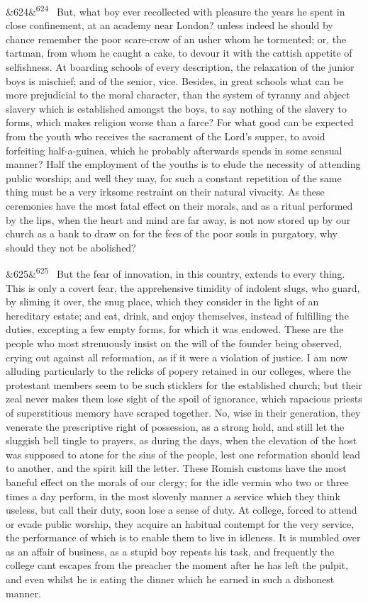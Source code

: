 \documentclass[12pt]{article}
\newcommand{\para}[1][]{\par\noindent\ifx&#1&\else\textsuperscript{\footnotesize #1}~\fi}
\begin{document}
\para[624] But, what boy ever recollected with pleasure the years he spent in close confinement, at an academy near London? unless indeed he should by chance remember the poor scare-crow of an usher whom he tormented; or, the tartman, from whom he caught a cake, to devour it with the cattish appetite of selfishness. At boarding schools of every description, the relaxation of the junior boys is mischief; and of the senior, vice. Besides, in great schools what can be more prejudicial to the moral character, than the system of tyranny and abject slavery which is established amongst the boys, to say nothing of the slavery to forms, which makes religion worse than a farce? For what good can be expected from the youth who receives the sacrament of the Lord's supper, to avoid forfeiting half-a-guinea, which he probably afterwards spends in some sensual manner? Half the employment of the youths is to elude the necessity of attending public worship; and well they may, for such a constant repetition of the same thing must be a very irksome restraint on their natural vivacity. As these ceremonies have the most fatal effect on their morals, and as a ritual performed by the lips, when the heart and mind are far away, is not now stored up by our church as a bank to draw on for the fees of the poor souls in purgatory, why should they not be abolished?

\para[625] But the fear of innovation, in this country, extends to every thing. This is only a covert fear, the apprehensive timidity of indolent slugs, who guard, by sliming it over, the snug place, which they consider in the light of an hereditary estate; and eat, drink, and enjoy themselves, instead of fulfilling the duties, excepting a few empty forms, for which it was endowed. These are the people who most strenuously insist on the will of the founder being observed, crying out against all reformation, as if it were a violation of justice. I am now alluding particularly to the relicks of popery retained in our colleges, where the protestant members seem to be such sticklers for the established church; but their zeal never makes them lose sight of the spoil of ignorance, which rapacious priests of superstitious memory have scraped together. No, wise in their generation, they venerate the prescriptive right of possession, as a strong hold, and still let the sluggish bell tingle to prayers, as during the days, when the elevation of the host was supposed to atone for the sins of the people, lest one reformation should lead to another, and the spirit kill the letter. These Romish customs have the most baneful effect on the morals of our clergy; for the idle vermin who two or three times a day perform, in the most slovenly manner a service which they think useless, but call their duty, soon lose a sense of duty. At college, forced to attend or evade public worship, they acquire an habitual contempt for the very service, the performance of which is to enable them to live in idleness. It is mumbled over as an affair of business, as a stupid boy repeats his task, and frequently the college cant escapes from the preacher the moment after he has left the pulpit, and even whilst he is eating the dinner which he earned in such a dishonest manner.
\end{document}

